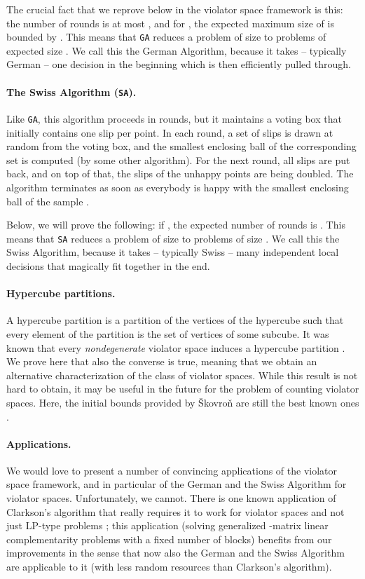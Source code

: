 \documentclass[12pt]{article}
\theoremstyle{remark}
\def\stageI{\texttt{GA}}
\def\stageII{\texttt{SA}}
\begin{document}
The crucial fact that we reprove below in the violator space framework
is this: the number of rounds is at most , and for , the expected maximum size of  is bounded by
. This means that \stageI{ }reduces a
problem of size  to  problems of expected size .
We call this the German Algorithm, because it takes -- typically
German -- one decision in the beginning which is then efficiently
pulled through.

\paragraph{The Swiss Algorithm (\stageII).} 
Like \stageI, this algorithm proceeds in rounds, but it
maintains a voting box that initially contains one slip per point. In
each round, a set of  slips is drawn at random from the voting box,
and the smallest enclosing ball of the corresponding set  is
computed (by some other algorithm). For the next round, all slips are
put back, and on top of that, the slips of the unhappy points are being
doubled. The algorithm terminates as soon as everybody is happy with
the smallest enclosing ball of the sample .

Below, we will prove the following: if , the expected number
of rounds is . This means that \stageII{ }reduces a
problem of size  to  problems of size . We call
this the Swiss Algorithm, because it takes -- typically Swiss -- many 
independent local decisions that magically fit together in the end.

\paragraph{Hypercube partitions.}
A hypercube partition is a partition of the vertices of the hypercube
such that every element of the partition is the set of vertices of
some subcube. It was known that every \emph{nondegenerate} violator
space induces a hypercube partition
\cite{SkovronMatousekLPdim,MatousekLPdim}.  We prove here that also
the converse is true, meaning that we obtain an alternative
characterization of the class of violator spaces. While this result is
not hard to obtain, it may be useful in the future for the problem of
counting violator spaces. Here, the initial bounds provided by
\v{S}kovro\v{n} are still the best known ones \cite{skovronP}.

\paragraph{Applications.} 
We would love to present a number of convincing
applications of the violator space framework, and in particular of the
German and the Swiss Algorithm for violator spaces. Unfortunately, we
cannot. There is one known application of Clarkson's algorithm that
really requires it to work for violator spaces and not just LP-type
problems \cite{journals/dam/GartnerMRS08}; this application (solving
generalized -matrix linear complementarity problems with a fixed
number of blocks) benefits from our improvements in the
sense that now also the German and the Swiss Algorithm are applicable
to it (with less random resources than Clarkson's algorithm).
\end{document}
